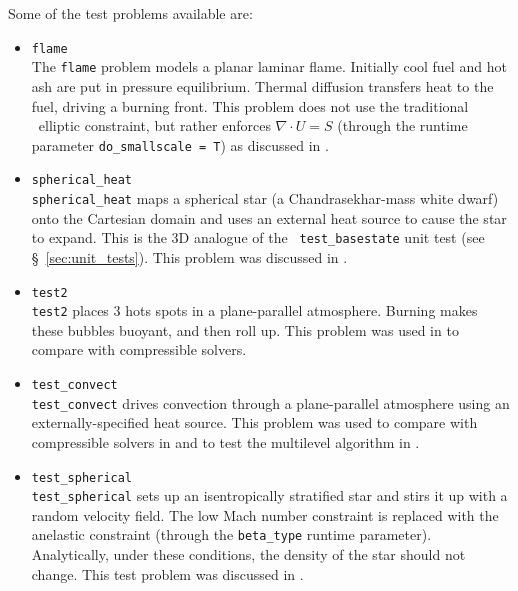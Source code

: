 Some of the test problems available are:
\begin{itemize}
\item {\tt flame} \\[-3mm]

The {\tt flame} problem models a planar laminar flame.  Initially cool
fuel and hot ash are put in pressure equilibrium.  Thermal diffusion
transfers heat to the fuel, driving a burning front.  This problem
does not use the traditional \maestro\ elliptic constraint, but
rather enforces $\nabla \cdot U = S$ (through the runtime parameter
{\tt do\_smallscale = T}) as discussed in \cite{SNe}.

\item {\tt spherical\_heat} \\[-3mm]

{\tt spherical\_heat} maps a spherical star (a Chandrasekhar-mass white
dwarf) onto the Cartesian domain and uses an external heat source to
cause the star to expand.  This is the 3D analogue of the {\tt
  test\_basestate} unit test (see \S~\ref{sec:unit_tests}).  This
problem was discussed in \cite{multilevel}.

\item {\tt test2} \\[-3mm]

{\tt test2} places 3 hots spots in a plane-parallel atmosphere.
Burning makes these bubbles buoyant, and then roll up.  This problem was
used in \cite{lowMach3} to compare with compressible solvers.

\item {\tt test\_convect} \\[-3mm]

{\tt test\_convect} drives convection through a plane-parallel
atmosphere using an externally-specified heat source.  This problem
was used to compare with compressible solvers in \cite{lowMach3}
and to test the multilevel algorithm in \cite{multilevel}.

\item {\tt test\_spherical} \\[-3mm]

{\tt test\_spherical} sets up an isentropically stratified star
and stirs it up with a random velocity field.  The low Mach number
constraint is replaced with the anelastic constraint (through
the {\tt beta\_type} runtime parameter).  Analytically, under
these conditions, the density of the star should not change.
This test problem was discussed in \cite{lowMach4}.

\end{itemize}




